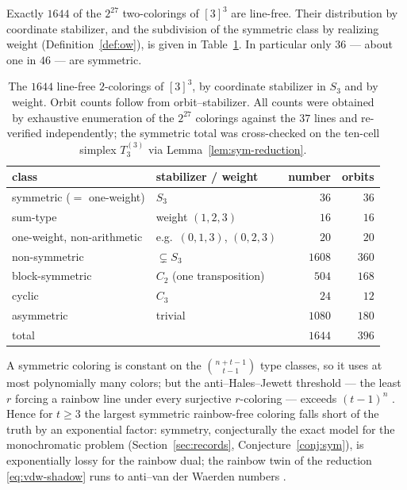 \documentclass[12pt]{article}
\begin{document}
\begin{theorem}\label{thm:census}
Exactly $1644$ of the $2^{27}$ two-colorings of $[3]^{3}$ are line-free.
Their distribution by coordinate stabilizer, and the subdivision of the
symmetric class by realizing weight \textup{(}Definition~\ref{def:ow}\textup{)},
is given in Table~\ref{tab:census}. In particular only $36$ --- about one
in $46$ --- are symmetric.
\end{theorem}

\begin{table}[ht]
\centering
\caption{The $1644$ line-free $2$-colorings of $[3]^{3}$, by coordinate
stabilizer in $S_{3}$ and by weight. Orbit counts follow from
orbit--stabilizer. All counts were obtained by exhaustive enumeration of
the $2^{27}$ colorings against the $37$ lines and re-verified
independently; the symmetric total was cross-checked on the ten-cell
simplex $T_{3}^{(3)}$ via Lemma~\ref{lem:sym-reduction}.}
\label{tab:census}
\begin{tabular}{@{}llrr@{}}
\toprule
class & stabilizer / weight & number & orbits\\
\midrule
symmetric ($=$ one-weight) & $S_{3}$ & $36$ & $36$\\
\quad sum-type & weight $(1,2,3)$ & $16$ & $16$\\
\quad one-weight, non-arithmetic & e.g.\ $(0,1,3)$, $(0,2,3)$ & $20$ & $20$\\
\addlinespace
non-symmetric & $\subsetneq S_{3}$ & $1608$ & $360$\\
\quad block-symmetric & $C_{2}$ (one transposition) & $504$ & $168$\\
\quad cyclic & $C_{3}$ & $24$ & $12$\\
\quad asymmetric & trivial & $1080$ & $180$\\
\midrule
total & & $1644$ & $396$\\
\bottomrule
\end{tabular}
\end{table}

\begin{remark}\label{rem:rainbow}
A symmetric coloring is constant on the $\binom{n+t-1}{t-1}$ type
classes, so it uses at most polynomially many colors; but the
anti--Hales--Jewett threshold --- the least $r$ forcing a rainbow line
under every surjective $r$-coloring --- exceeds $(t-1)^{n}$
\cite{zheng2024rainbow}. Hence for $t\ge 3$ the largest symmetric
rainbow-free coloring falls short of the truth by an exponential factor:
symmetry, conjecturally the exact model for the monochromatic problem
(Section~\ref{sec:records}, Conjecture~\ref{conj:sym}), is
exponentially lossy for the rainbow dual; the rainbow twin of the reduction
\eqref{eq:vdw-shadow} runs to anti--van der Waerden numbers
\cite{berikkyzy2017antivdw}.
\end{remark}
\end{document}
